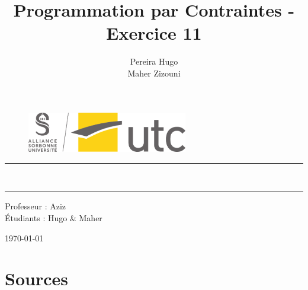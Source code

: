 \documentclass{latexPackage/utc-report/utc-report}
\title{Programmation par Contraintes - Exercice 11}
\author{{\sc Pereira} Hugo \\ {\sc Maher} Zizouni}
\begin{document}
\thispagestyle{empty}
\setcounter{page}{0}

\begin{figure}[H]
\centering
\includegraphics[width=7cm]{latexPackage/utc-report/utc-graphics/logos/UTC/logo_UTC.pdf}
\end{figure}

\vspace{2cm}

\begin{center}

{\color{jauneUTC}\rule{\linewidth}{0.8mm}}
\vspace*{0mm}

\Huge{\textbf{\theUV \\ \thetitle}}
{\color{jauneUTC}\rule{\linewidth}{0.8mm}}

\vspace{2cm}

\Large{
    Professeur :  Aziz \\
    Étudiants :  Hugo \&  Maher
} \\

\vspace{2cm}

\today

\end{center}

\pagebreak

\tableofcontents{}

\pagebreak

\section{Sources}

\pagebreak

\listoffigures
\end{document}
